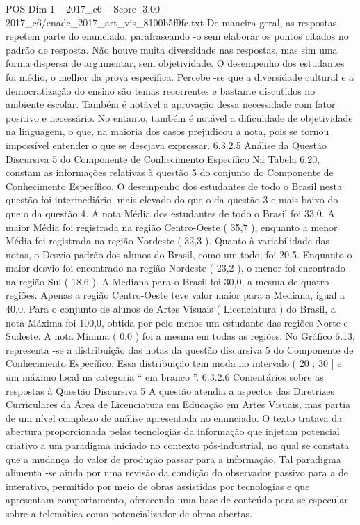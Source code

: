 \begin{textsample}{POS Dim 1 – 2017\_c6 – Score -3.00 – 2017\_c6/enade\_2017\_art\_vis\_8100b5f9fc.txt}
De maneira geral, as respostas repetem parte do enunciado, parafraseando -o sem elaborar os pontos citados no padrão de resposta.
Não houve muita diversidade nas respostas, mas sim uma forma dispersa de argumentar, sem objetividade.
O desempenho dos estudantes foi médio, o melhor da prova específica.
Percebe -se que a diversidade cultural e a democratização do ensino são temas recorrentes e bastante discutidos no ambiente escolar.
Também é notável a aprovação dessa necessidade com fator positivo e necessário.
No entanto, também é notável a dificuldade de objetividade na linguagem, o que, na maioria dos casos prejudicou a nota, pois se tornou impossível entender o que se desejava expressar. 6.3.2.5 Análise da Questão Discursiva 5 do Componente de Conhecimento Específico Na Tabela 6.20, constam as informações relativas à questão 5 do conjunto do Componente de Conhecimento Específico.
O desempenho dos estudantes de todo o Brasil nesta questão foi intermediário, mais elevado do que o da questão 3 e mais baixo do que o da questão 4.
A nota Média dos estudantes de todo o Brasil foi 33,0.
A maior Média foi registrada na região Centro-Oeste ( 35,7 ), enquanto a menor Média foi registrada na região Nordeste ( 32,3 ).
Quanto à variabilidade das notas, o Desvio padrão dos alunos do Brasil, como um todo, foi 20,5.
Enquanto o maior desvio foi encontrado na região Nordeste ( 23,2 ), o menor foi encontrado na região Sul ( 18,6 ).
A Mediana para o Brasil foi 30,0, a mesma de quatro regiões.
Apenas a região Centro-Oeste teve valor maior para a Mediana, igual a 40,0.
Para o conjunto de alunos de Artes Visuais ( Licenciatura ) do Brasil, a nota Máxima foi 100,0, obtida por pelo menos um estudante das regiões Norte e Sudeste.
A nota Mínima ( 0,0 ) foi a mesma em todas as regiões.
No Gráfico 6.13, representa -se a distribuição das notas da questão discursiva 5 do Componente de Conhecimento Específico.
Essa distribuição tem moda no intervalo ( 20 ; 30 ] e um máximo local na categoria “ em branco ”. 6.3.2.6 Comentários sobre as respostas à Questão Discursiva 5 A questão atendia a aspectos das Diretrizes Curriculares da Área de Licenciatura em Educação em Artes Visuais, mas partia de um nível complexo de análise apresentada no enunciado.
O texto tratava da abertura proporcionada pelas tecnologias da informação que injetam potencial criativo a um paradigma iniciado no contexto pós-industrial, no qual se constata que a mudança do valor de produção passar para a informação.
Tal paradigma alimenta -se ainda por uma revisão da condição do observador passivo para a de interativo, permitido por meio de obras assistidas por tecnologias e que apresentam comportamento, oferecendo uma base de conteúdo para se especular sobre a telemática como potencializador de obras abertas.

\end{textsample}
